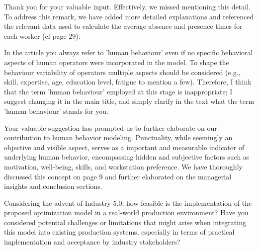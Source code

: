 \documentclass[preprint,11pt,3p]{elsarticle}
\begin{document}
\begin{tcolorbox}[colback=r_color1,colframe=r_color2,title=Response Q3 :]
Thank you for your valuable input. Effectively, we missed mentioning this detail. To address this remark, we have added more detailed explanations and referenced the relevant data used to calculate the average absence and presence times for each worker (cf page 29).


 

\end{tcolorbox}
\begin{tcolorbox}[colback=q_color1,colframe=q_color2,title=Q4:]
	In the article you always refer to 'human behaviour' even if no specific behavioral aspects of human operators were incorporated in the model. To shape the behaviour variability of operators multiple aspects should be considered (e.g., skill, expertise, age, education level, fatigue to mention a few). Therefore, I think that the term 'human behaviour' employed at this stage is inappropriate; I suggest changing it in the main title, and simply clarify in the text what the term 'human behaviour' stands for you.
			
\end{tcolorbox}


\begin{tcolorbox}[colback=r_color1,colframe=r_color2,title=Response Q4:]
Your valuable suggestion has prompted us to further elaborate on our contribution to human behavior modeling. Punctuality, while seemingly an objective and visible aspect, serves as a important and measurable indicator of underlying human behavior, encompassing hidden and subjective factors such as motivation, well-being, skills, and workstation preference. We have thoroughly discussed this concept on page 9 and further elaborated on the managerial insights and conclusion sections.	
\end{tcolorbox}
\begin{tcolorbox}[colback=q_color1,colframe=q_color2,title=Q5:]
	Considering the advent of Industry 5.0, how feasible is the implementation of the proposed optimization model in a real-world production environment? Have you considered potential challenges or limitations that might arise when integrating this model into existing production systems, especially in terms of practical implementation and acceptance by industry stakeholders?
\end{tcolorbox}
\end{document}
